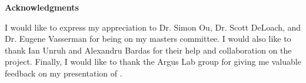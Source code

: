 
\newpage
\vspace*{0.9cm}
\begin{center}
{\bf \Huge Acknowledgments}
\end{center}

\setlength{\baselineskip}{0.8cm}



I would like to express my appreciation to Dr. Simon Ou, Dr. Scott DeLoach, and Dr. Eugene Vasserman for being on my masters committee. I would also like to thank Ian Unruh and Alexandru Bardas for their help and collaboration on the \ancor{} project. Finally, I would like to thank the Argus Lab group for giving me valuable feedback on my presentation of \projectName{}.
